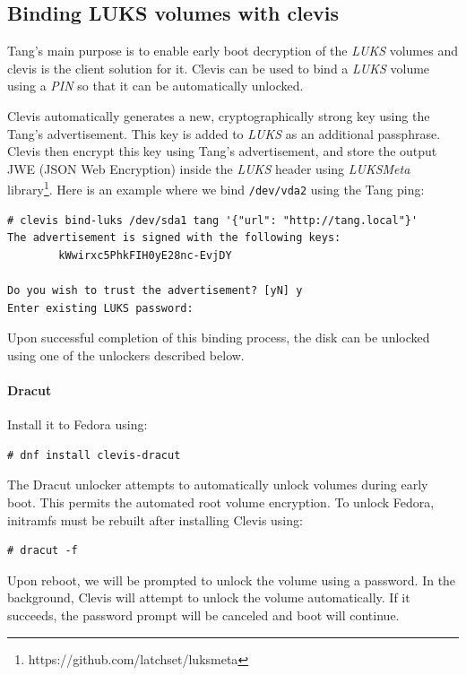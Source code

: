 \subsection{Binding LUKS volumes with clevis}\label{dracut}
Tang's main purpose is to enable early boot decryption of the {\it LUKS} volumes and clevis is the client solution for it.
Clevis can be used to bind a {\it LUKS} volume using a {\it PIN} so that it can be automatically unlocked.

Clevis automatically generates a new, cryptographically strong key using the Tang's advertisement.
This key is added to {\it LUKS} as an additional passphrase.
Clevis then encrypt this key using Tang's advertisement, and store the output JWE (JSON Web Encryption) inside the {\it LUKS} header using {\it LUKSMeta} library\footnote{https://github.com/latchset/luksmeta}.
Here is an example where we bind {\tt /dev/vda2} using the Tang ping:
\begin{lstlisting}[columns=fixed,basicstyle=\ttfamily\footnotesize,tabsize=4,backgroundcolor=\color{yellow!10}]
# clevis bind-luks /dev/sda1 tang '{"url": "http://tang.local"}'
The advertisement is signed with the following keys:
        kWwirxc5PhkFIH0yE28nc-EvjDY

Do you wish to trust the advertisement? [yN] y
Enter existing LUKS password:
\end{lstlisting}

Upon successful completion of this binding process, the disk can be unlocked using one of the unlockers described below.



\paragraph{Dracut}\label{dracut}Install it to Fedora using:
\begin{lstlisting}[columns=fixed,basicstyle=\ttfamily\footnotesize,tabsize=4,backgroundcolor=\color{yellow!10}]
# dnf install clevis-dracut
\end{lstlisting}

The Dracut unlocker attempts to automatically unlock volumes during early boot.
This permits the automated root volume encryption.
To unlock Fedora, initramfs must be rebuilt after installing Clevis using:

\begin{lstlisting}[columns=fixed,basicstyle=\ttfamily\footnotesize,tabsize=4,backgroundcolor=\color{yellow!10}]
# dracut -f
\end{lstlisting}
Upon reboot, we will be prompted to unlock the volume using a password.
In the background, Clevis will attempt to unlock the volume automatically.
If it succeeds, the password prompt will be canceled and boot will continue.



